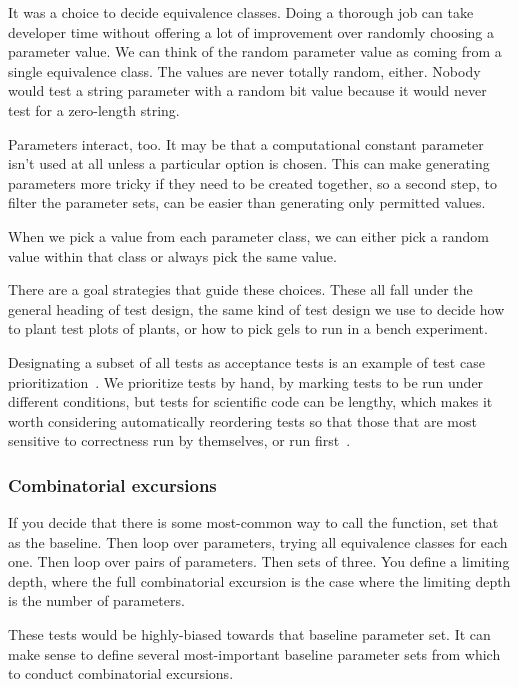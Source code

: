 \documentclass[fleqn,10pt]{olplainarticle}
\begin{document}
It was a choice to decide equivalence classes. Doing a thorough
job can take developer time without offering a lot of improvement
over randomly choosing a parameter value. We can think of the
random parameter value as coming from a single equivalence
class. The values are never
totally random, either. Nobody would test a string parameter with
a random bit value because it would never test for a zero-length
string.

Parameters interact, too. It may be that a computational constant
parameter isn't used at all unless a particular option is chosen.
This can make generating parameters more tricky if they need
to be created together, so a second step, to filter the parameter
sets, can be easier than generating only permitted values.

When we pick a value from each parameter class, we can either
pick a random value within that class or always pick the
same value.

There are a goal strategies that guide these choices.
These all fall under the general heading of test design,
the same kind of test design we use to decide how
to plant test plots of plants, or how to pick gels to
run in a bench experiment.

Designating a subset of all tests as acceptance tests is an
example of test case prioritization~\cite{rothermel1999test}.
We prioritize tests by hand, by marking tests to be run under
different conditions, but tests for scientific code can be lengthy,
which makes it worth considering automatically reordering tests
so that those that are most sensitive to correctness run by 
themselves, or run first~\cite{yoo2012regression}.

\subsubsection{Combinatorial excursions}
If you decide that there is some most-common way to call
the function, set that as the baseline. Then loop over parameters,
trying all equivalence classes for each one. Then loop over pairs of parameters. Then sets of three. You define a limiting depth,
where the full combinatorial excursion is the case where the
limiting depth is the number of parameters.

These tests would be highly-biased towards that baseline parameter set.
It can make sense to define several most-important baseline
parameter sets from which to conduct combinatorial excursions.
\end{document}
